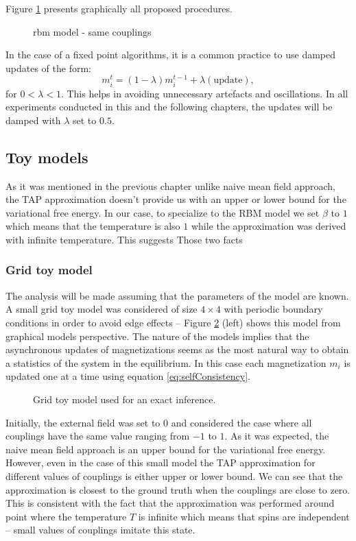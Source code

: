 \documentclass[../report/report.tex]{subfiles}
\begin{document}
Figure \ref{fig:updates} presents graphically all proposed procedures.
\begin{figure}[!htb]
\label{fig:updates}
  \caption[1]{rbm model - same couplings}
\end{figure}
In the case of a fixed point algorithms, it is a common practice to use damped updates \cite{murphy2012machine} of the form:
$$ m_i^{t} = (1- \lambda) m_i^{t-1} + \lambda(\text{update}),$$
for $0 <\lambda<1$. This helps in avoiding unnecessary artefacts and oscillations. In all experiments conducted in this and the following chapters, the updates will be damped with $\lambda$ set to $0.5$.

\subsection{Toy models}
As it was mentioned in the previous chapter unlike naive mean field approach, the TAP approximation doesn't provide us with an upper or lower bound for the variational free energy. In our case, to specialize to the RBM model we set $\beta$ to $1$ which means that the temperature is also $1$ while the approximation was derived with infinite temperature. This suggests  Those two facts

\subsubsection{Grid toy model}
The analysis will be made assuming that the parameters of the model are known. A small grid toy model was considered of size $4 \times 4$ with periodic boundary conditions in order to avoid edge effects -- Figure \ref{fig:gridPlot} (left) shows this model from graphical models perspective. The nature of the models implies that the asynchronous updates of magnetizations seems as the most natural way to obtain a statistics of the system in the equilibrium. In this case each magnetization $m_i$ is updated one at a time using equation \ref{eq:selfConsistency}.

\begin{figure}[!htb]
%
\endminipage 
{}  
\endminipage\hfill
\label{fig:gridPlot}
  \caption[1]{Grid toy model used for an exact inference.}
\end{figure}

Initially, the external field was set to $0$ and considered the case where all couplings have the same value ranging from $-1$ to $1$. As it was expected, the naive mean field approach is an upper bound for the variational free energy. However, even in the case of this small model the TAP approximation for different values of couplings is either upper or lower bound. We can see that the approximation is closest to the ground truth when the couplings are close to zero. This is consistent with the fact that the approximation was performed around point where the temperature $T$ is infinite which means that spins are independent -- small values of couplings imitate this state.
\end{document}
